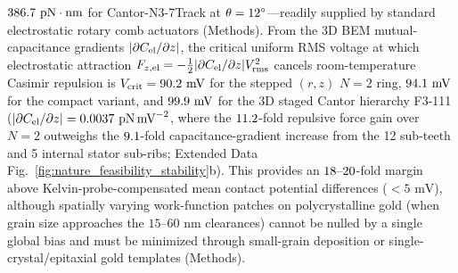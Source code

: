 \documentclass[pdflatex,sn-nature]{sn-jnl}
\DeclareRobustCommand{\roundzero}[1]{\fpeval{round(#1,0)}}
\DeclareRobustCommand{\roundone}[1]{\fpeval{round(#1,1)}}
\DeclareRobustCommand{\roundfour}[1]{\fpeval{round(#1,4)}}
\begin{document}
$\roundone{\NatureFractalNthreeCantorseventrackPeakTorquePnNm}\text{ pN}\cdot\text{nm}$ for Cantor-N3-7Track at $\theta = 12{}^\circ$---readily supplied by standard electrostatic rotary comb actuators (Methods). From the 3D BEM mutual-capacitance gradients $|\partial C_{\rm el}/\partial z|$, the critical uniform RMS voltage at which electrostatic attraction $F_{z,\rm el} = -\frac{1}{2}|\partial C_{\rm el}/\partial z|V_{\rm rms}^2$ cancels room-temperature Casimir repulsion is $V_{\rm crit} = \roundone{\NatureCantorNtwoHybridrzPatchPotentialVCritMv}\text{ mV}$ for the stepped $(r,z)$ $N=2$ ring, $\roundone{\NatureRotCeightCompactNtwoPatchPotentialVCritMv}\text{ mV}$ for the compact variant, and $\roundone{\NatureFthreeOneoneoneVCritMv}\text{ mV}$ for the 3D staged Cantor hierarchy F3-111 ($|\partial C_{\rm el}/\partial z| = \roundfour{\NatureFthreeOneoneoneAbsDcDzPnPerMvtwo}\text{ pN}\,\text{mV}^{-2}$, where the $\roundone{\fpeval{\NatureFthreeOneoneoneFRepThreezerozerokPn/\NatureCantorNtwoHybridrzPatchPotentialFCasimirGoldThreezerozerokPn}}$-fold repulsive force gain over $N=2$ outweighs the $\roundone{\fpeval{\NatureFthreeOneoneoneAbsDcDzPnPerMvtwo/\NatureCantorNtwoHybridrzPatchPotentialAbsDcDzPnPerMvtwo}}$-fold capacitance-gradient increase from the 12 sub-teeth and 5 internal stator sub-ribs; Extended Data Fig.~\ref{fig:nature_feasibility_stability}b). This provides an $\roundzero{\fpeval{\NatureCantorNtwoHybridrzPatchPotentialVCritMv/5}}\text{--}\roundzero{\fpeval{\NatureFthreeOneoneoneVCritMv/5}}$-fold margin above Kelvin-probe-compensated mean contact potential differences ($<5\text{ mV}$), although spatially varying work-function patches on polycrystalline gold (when grain size approaches the $15\text{--}60\text{ nm}$ clearances) cannot be nulled by a single global bias and must be minimized through small-grain deposition or single-crystal/epitaxial gold templates (Methods).
\end{document}
